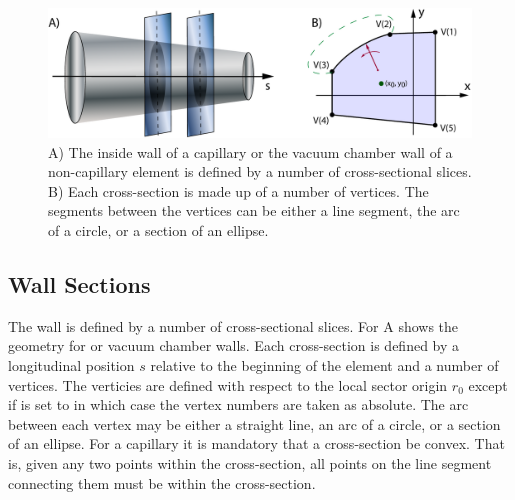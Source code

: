 
\begin{figure}[tb]
  \centering
  \includegraphics[width=6in]{chamber-wall.pdf}
  \caption[Capillary or vacuum chamber wall.]
{A) The inside wall of a capillary or the vacuum chamber wall of a
non-capillary element is defined by a number of cross-sectional
slices.  B) Each cross-section is made up of a number of vertices. The
segments between the vertices can be either a line segment, the arc of
a circle, or a section of an ellipse.}
  \label{f:chamber.wall}
\end{figure}

\subsection{Wall Sections}
\label{s:wall.section}

The wall is defined by a number of cross-sectional slices. For
A shows the geometry for  or vacuum
chamber walls.  Each cross-section is defined by a longitudinal
position $s$ relative to the beginning of the element and a number of
vertices. The verticies are defined with respect to the local sector
origin $r_0$ except if  is set to  in
which case the vertex numbers are taken as absolute. The arc between
each vertex may be either a straight line, an arc of a circle, or a
section of an ellipse. For a capillary it is mandatory that a
cross-section be convex. That is, given any two points within the
cross-section, all points on the line segment connecting them must be
within the cross-section.

